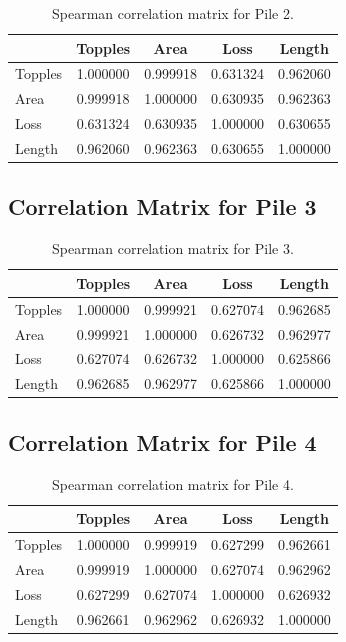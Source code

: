 \begin{table}[htbp]
	\centering
	\begin{tabular}{lcccc}
		\hline
		& Topples & Area & Loss & Length \\
		\hline
		Topples & 1.000000 & 0.999918 & 0.631324 & 0.962060 \\
		Area    & 0.999918 & 1.000000 & 0.630935 & 0.962363 \\
		Loss    & 0.631324 & 0.630935 & 1.000000 & 0.630655 \\
		Length  & 0.962060 & 0.962363 & 0.630655 & 1.000000 \\
		\hline
	\end{tabular}
	\caption{Spearman correlation matrix for Pile 2.}
	\label{tab:corr_2}
\end{table}

\subsection{Correlation Matrix for Pile 3}
\begin{table}[htbp]
	\centering
	\begin{tabular}{lcccc}
		\hline
		& Topples & Area & Loss & Length \\
		\hline
		Topples & 1.000000 & 0.999921 & 0.627074 & 0.962685 \\
		Area    & 0.999921 & 1.000000 & 0.626732 & 0.962977 \\
		Loss    & 0.627074 & 0.626732 & 1.000000 & 0.625866 \\
		Length  & 0.962685 & 0.962977 & 0.625866 & 1.000000
		 \\
		\hline
	\end{tabular}
	\caption{Spearman correlation matrix for Pile 3.}
	\label{tab:corr_3}
\end{table}

\subsection{Correlation Matrix for Pile 4}
\begin{table}[htbp]
	\centering
	\begin{tabular}{lcccc}
		\hline
		& Topples & Area & Loss & Length \\
		\hline
		Topples & 1.000000 & 0.999919 & 0.627299 & 0.962661 \\
		Area    & 0.999919 & 1.000000 & 0.627074 & 0.962962 \\
		Loss    & 0.627299 & 0.627074 & 1.000000 & 0.626932 \\
		Length  & 0.962661 & 0.962962 & 0.626932 & 1.000000 \\
		\hline
	\end{tabular}
	\caption{Spearman correlation matrix for Pile 4.}
	\label{tab:corr_4}
\end{table}

